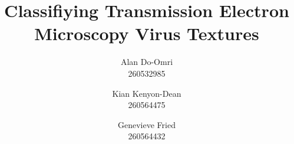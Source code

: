 

\linespread{1.05}
\usepackage{lipsum}
\usepackage{multicol}
\usepackage{alltt}
\usepackage[margin=1in]{geometry}
\usepackage{mathtools}
\usepackage{hyperref}
\usepackage{paralist}
\usepackage{float}
\usepackage{microtype}
\usepackage{abstract}
\usepackage[utf8]{inputenc}
\usepackage[numbers]{natbib}
\usepackage{graphicx}
\renewcommand{\abstractnamefont}{\large\bfseries} %
\renewcommand{\abstracttextfont}{\normalfont\itshape} %
\usepackage{lettrine}
\usepackage{tabulary}
\usepackage{import}
\usepackage{enumitem}
\usepackage{pgf}


\usepackage{titlesec} %

\usepackage{fancyhdr} %
\pagestyle{fancy} %
\fancyhead{} %
\fancyfoot{} %
\fancyfoot[RO,LE]{\thepage} %

\title{\fontsize{18pt}{10pt}\textbf{Classifiying Transmission Electron Microscopy Virus Textures}} %


\author{
\large{Alan Do-Omri}\\[2mm] 
\normalsize 260532985 \\ 
\and 
\large{Kian Kenyon-Dean}\\[2mm]
\normalsize 260564475 \\
\and
\large{Genevieve Fried}\\[2mm]
\normalsize 260564432 \\
}




